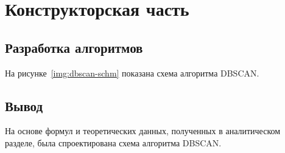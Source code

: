 \chapter{Конструкторская часть}

\section*{Разработка алгоритмов}

На рисунке~\ref{img:dbscan-schm} показана схема алгоритма DBSCAN. 

\section*{Вывод}

На основе формул и теоретических данных, полученных в аналитическом разделе, была спроектирована схема алгоритма DBSCAN.